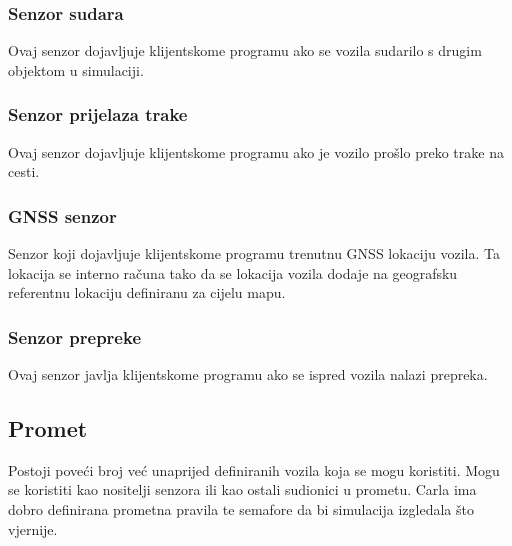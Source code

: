 \subsubsection{Senzor sudara}
Ovaj senzor dojavljuje klijentskome programu ako se vozila sudarilo s drugim objektom u simulaciji.

\subsubsection{Senzor prijelaza trake}
Ovaj senzor dojavljuje klijentskome programu ako je vozilo prošlo preko trake na cesti.

\subsubsection{GNSS senzor}
Senzor koji dojavljuje klijentskome programu trenutnu GNSS lokaciju vozila. Ta lokacija se interno računa tako da se lokacija vozila dodaje na geografsku referentnu lokaciju definiranu za cijelu mapu.

\subsubsection{Senzor prepreke}
Ovaj senzor javlja klijentskome programu ako se ispred vozila nalazi prepreka.

\subsection{Promet}
Postoji poveći broj već unaprijed definiranih vozila koja se mogu koristiti. Mogu se koristiti kao nositelji senzora ili kao ostali sudionici u prometu. Carla ima dobro definirana prometna pravila te semafore da bi simulacija izgledala što vjernije.
\newpage